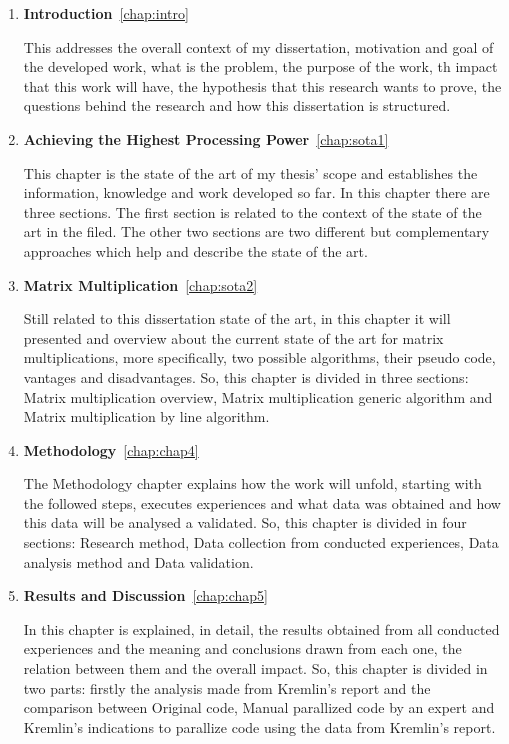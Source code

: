 \begin{enumerate}
	\item \textbf{Introduction}~\ref{chap:intro}

This addresses the overall context of my dissertation, motivation and goal of the developed work, what is the problem, the purpose of the work, th impact that this work will have, the hypothesis that this research wants to prove, the questions behind the research and how this dissertation is structured.

	\item \textbf{Achieving the Highest Processing Power}~\ref{chap:sota1}
	
This chapter is the state of the art of my thesis' scope and establishes the information, knowledge and work developed so far. In this chapter there are three sections. The first section is related to the context of the state of the art in the filed. The other two sections are two different but complementary approaches which help and describe the state of the art. 	

	\item \textbf{Matrix Multiplication}~\ref{chap:sota2}
	
Still related to this dissertation state of the art, in this chapter it will presented and overview about the current state of the art for matrix multiplications, more specifically, two possible algorithms, their pseudo code, vantages and disadvantages. So, this chapter is divided in three sections: Matrix multiplication overview, Matrix multiplication generic algorithm and Matrix multiplication by line algorithm.
	
	\item \textbf{Methodology}~\ref{chap:chap4}

The Methodology chapter explains how the work will unfold, starting with the followed steps, executes experiences and what data was obtained and how this data will be analysed a validated. So, this chapter is divided in four sections: Research method, Data collection from conducted experiences, Data analysis method and Data validation.

	\item \textbf{Results and Discussion}~\ref{chap:chap5}
	
In this chapter is explained, in detail, the results obtained from all conducted experiences and the meaning and conclusions drawn from each one, the relation between them and the overall impact. So, this chapter is divided in two parts: firstly the analysis made from Kremlin's report and the comparison between Original code, Manual parallized code by an expert and Kremlin's indications to parallize code using the data from Kremlin's report.
	

\end{enumerate}
